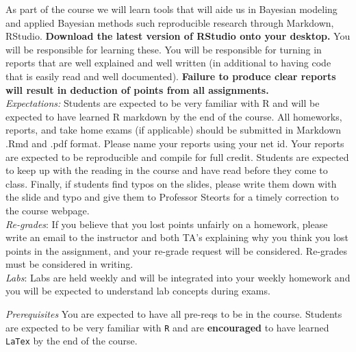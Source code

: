 \documentclass[11pt]{article}
\begin{document}
As part of the course we will learn tools that will aide us in Bayesian modeling and applied Bayesian methods such reproducible research through Markdown, RStudio. \textbf{Download the latest version of RStudio onto your desktop.} You will be responsible for learning these. You will be responsible for turning in reports that are well explained and well written (in additional to having code that is easily read and well documented). \textbf{Failure to produce clear reports will result in deduction of points from all assignments.} 
\\

\emph{Expectations:} Students are expected to be very familiar with R and will be expected to have learned R markdown by the end of the course. All homeworks, reports, and take home exams (if applicable) should be submitted in Markdown .Rmd and .pdf format. Please name your reports using your net id. Your reports are expected to be reproducible and compile for full credit. Students are expected to keep up with the reading in the course and have read before they come to class. Finally, if students find typos on the slides, please write them down with the slide and typo and give them to Professor Steorts for a timely correction to the course webpage.  \\

\emph{Re-grades}: If you believe that you lost points unfairly on a homework, please write an email to the instructor and both TA's explaining why you think you lost points in the assignment, and your re-grade request will be considered. Re-grades must be considered in writing. \\

\emph{Labs}: Labs are held weekly and will be integrated into your weekly homework and you will be expected to understand lab concepts during exams. 

\emph{Prerequisites} You are expected to have all pre-reqs to be in the course. Students are expected to be very familiar with \texttt{R} and are \textbf{encouraged} to have learned \texttt{LaTex} by the end of the course. 
\end{document}
